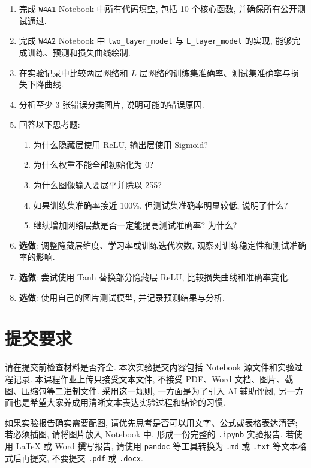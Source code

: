 \documentclass{../../nndlcourse}
\begin{document}
\begin{enumerate}
    \item 完成 \texttt{W4A1} Notebook 中所有代码填空, 包括 10 个核心函数, 并确保所有公开测试通过.
    \item 完成 \texttt{W4A2} Notebook 中 \texttt{two\_layer\_model} 与 \texttt{L\_layer\_model} 的实现, 能够完成训练、预测和损失曲线绘制.
    \item 在实验记录中比较两层网络和 $L$ 层网络的训练集准确率、测试集准确率与损失下降曲线.
    \item 分析至少 3 张错误分类图片, 说明可能的错误原因.
    \item 回答以下思考题:
    \begin{enumerate}
        \item 为什么隐藏层使用 ReLU, 输出层使用 Sigmoid?
        \item 为什么权重不能全部初始化为 0?
        \item 为什么图像输入要展平并除以 255?
        \item 如果训练集准确率接近 100\%, 但测试集准确率明显较低, 说明了什么?
        \item 继续增加网络层数是否一定能提高测试准确率? 为什么?
    \end{enumerate}
    \item \textbf{选做}: 调整隐藏层维度、学习率或训练迭代次数, 观察对训练稳定性和测试准确率的影响.
    \item \textbf{选做}: 尝试使用 Tanh 替换部分隐藏层 ReLU, 比较损失曲线和准确率变化.
    \item \textbf{选做}: 使用自己的图片测试模型, 并记录预测结果与分析.
\end{enumerate}


\section{提交要求}

请在提交前检查材料是否齐全. 本次实验提交内容包括 Notebook 源文件和实验过程记录. 本课程作业上传只接受文本文件, 不接受 PDF、Word 文档、图片、截图、压缩包等二进制文件. 采用这一规则, 一方面是为了引入 AI 辅助评阅, 另一方面也是希望大家养成用清晰文本表达实验过程和结论的习惯.

如果实验报告确实需要配图, 请优先思考是否可以用文字、公式或表格表达清楚; 若必须插图, 请将图片放入 Notebook 中, 形成一份完整的 \texttt{.ipynb} 实验报告. 若使用 \LaTeX{} 或 Word 撰写报告, 请使用 \texttt{pandoc} 等工具转换为 \texttt{.md} 或 \texttt{.txt} 等文本格式后再提交, 不要提交 \texttt{.pdf} 或 \texttt{.docx}.
\end{document}
